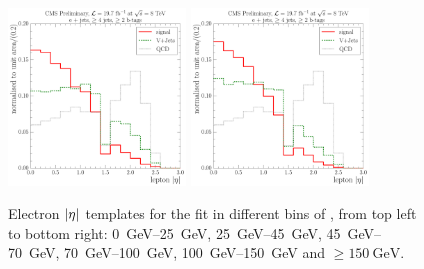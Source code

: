\begin{figure}[!htbp]
  	\hspace*{\fill} \\
  	\hspace*{\fill}
  	{\includegraphics[width=0.42\textwidth]{measurement/MET/central/fit_templates/electron_templates_bin_100-150}}\hfill
  	{\includegraphics[width=0.42\textwidth]{measurement/MET/central/fit_templates/electron_templates_bin_150-inf}}
  	\hspace*{\fill}
    \caption[Electron $\abs \eta$ templates for the fit in different bins of \MET]{Electron $\abs \eta$ templates for
    the fit in different bins of \MET, from top left to bottom right: \SIrange{0}{25}{\GeV}, \SIrange{25}{45}{\GeV},
    \SIrange{45}{70}{\GeV}, \SIrange{70}{100}{\GeV}, \SIrange{100}{150}{\GeV} and $\geq \SI{150}{\GeV}$.}
    \label{fig:fit_templates_MET_electron}
\end{figure}

